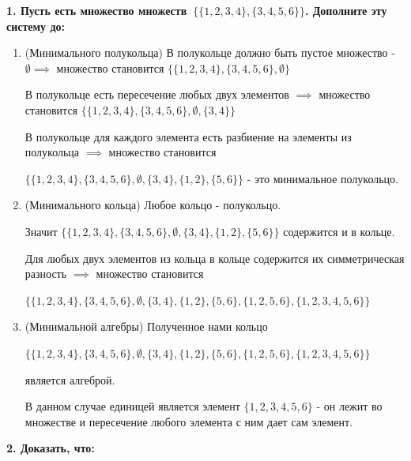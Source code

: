\documentclass{article}
\begin{document}
\noindent \textbf{1. Пусть есть множество множеств $\{\{1,2,3,4\},\{3,4,5,6\}\}$. Дополните эту систему до:}

\begin{enumerate}

\item(Минимального полукольца) В полукольце должно быть пустое множество - $\emptyset \implies$ множество становится $\{\{1,2,3,4\},\{3,4,5,6\}, \emptyset\}$

В полукольце есть пересечение любых двух элементов $\implies$ множество становится $\{\{1,2,3,4\},\{3,4,5,6\}, \emptyset, \{3,4\}\}$

В полукольце для каждого элемента есть разбиение на элементы из полукольца $\implies$ множество становится 

$\{\{1,2,3,4\},\{3,4,5,6\}, \emptyset, \{3,4\}, \{1,2\}, \{5,6\}\}$
 - это минимальное полукольцо.

\item(Минимального кольца) Любое кольцо - полукольцо. 

Значит $\{\{1,2,3,4\},\{3,4,5,6\}, \emptyset, \{3,4\}, \{1,2\}, \{5,6\}\}$ содержится и в кольце.

Для любых двух элементов из кольца в кольце содержится их симметрическая разность $\implies$ множество становится 

$\{\{1,2,3,4\},\{3,4,5,6\}, \emptyset, \{3,4\}, \{1,2\}, \{5,6\}, \{1,2,5,6\}, \{1,2,3,4,5,6\}\}$


\item(Минимальной алгебры) Полученное нами кольцо

$\{\{1,2,3,4\},\{3,4,5,6\}, \emptyset, \{3,4\}, \{1,2\}, \{5,6\}, \{1,2,5,6\}, \{1,2,3,4,5,6\}\}$ 

является алгеброй.

В данном случае единицей является элемент $\{1,2,3,4,5,6\}$ - он лежит во множестве и пересечение любого элемента с ним дает сам элемент.
\end{enumerate}

\noindent \textbf{2. Доказать, что:}
\end{document}
